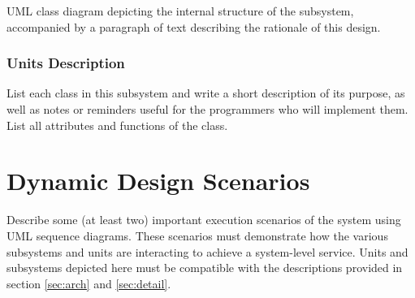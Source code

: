 \documentclass[12pt]{article}
\begin{document}
UML class diagram depicting the internal structure of the subsystem,
accompanied by a paragraph of text describing the rationale of this design.

\subsubsection{Units Description}

List each class in this subsystem and write a short description of its purpose,
as well as notes or reminders useful for the programmers who will implement them.
List all attributes and functions of the class.

\section{Dynamic Design Scenarios}

Describe some (at least two) important execution scenarios of the system using UML sequence diagrams.
These scenarios must demonstrate how the various subsystems and units are interacting to achieve a system-level service.
Units and subsystems depicted here must be compatible with the descriptions provided in
section \ref{sec:arch} and \ref{sec:detail}.
\end{document}
